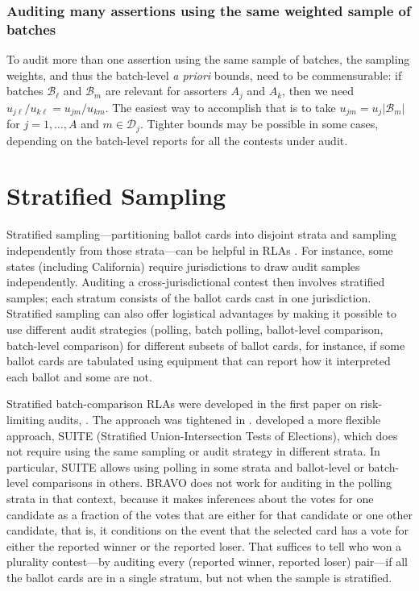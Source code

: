 \documentclass[aoas]{imsart}
\newcommand{\cB}{\ensuremath{\mathcal{B}}}
\newcommand{\cD}{\ensuremath{\mathcal{D}}}
\begin{document}
\subsubsection{Auditing many assertions using the same weighted sample of batches}
To audit more than one assertion using the same sample of batches, the sampling weights,
and thus the batch-level \emph{a priori} bounds, need to be commensurable:
if batches $\cB_\ell$ and $\cB_m$ are relevant for assorters $A_j$ and $A_k$, then we need
$u_{j\ell}/u_{k \ell} = u_{jm}/u_{km}$.
The easiest way to accomplish that is to take $u_{jm} = u_j |\cB_m|$ for $j = 1, \ldots, A$ and $m \in \cD_j$.
Tighter bounds may be possible in some cases, depending on the batch-level reports for all the contests
under audit.

\section{Stratified Sampling} \label{sec:stratified}
Stratified sampling---partitioning ballot cards into disjoint strata and sampling independently from those 
strata---can be helpful in RLAs  \citep{stark08a,higginsEtal11,ottoboniEtal18,stark20}.
For instance, some states (including California) require jurisdictions to draw audit samples independently.
Auditing a cross-jurisdictional contest then involves stratified samples; each stratum consists of the ballot
cards cast in one jurisdiction.
Stratified sampling can also offer logistical advantages by making it possible to use different audit strategies 
(polling, batch polling, ballot-level comparison, batch-level comparison) for 
different subsets of ballot cards, for instance, if some ballot cards are tabulated using equipment that can report how it
interpreted each ballot and some are not.

Stratified batch-comparison RLAs were developed in the first paper on risk-limiting audits, \citet{stark08a}.
The approach was tightened in \citet{higginsEtal11}.
\citet{ottoboniEtal18} developed a more flexible approach, SUITE (Stratified Union-Intersection Tests of Elections),
which does not require using the same sampling or audit strategy in different strata.
In particular, SUITE allows using polling in some strata and ballot-level or batch-level comparisons in others.
BRAVO does not work for auditing in the polling strata in that context, because it makes inferences about the votes 
for one candidate as a fraction of the votes that are either for that candidate or one other candidate, that is, it
conditions on the event that the selected card has a vote for either the reported winner or the reported loser.
That suffices to tell who won a plurality contest---by auditing every (reported winner, reported loser) 
pair---if all the ballot cards are in a single stratum, but not when the sample is stratified.
\end{document}
